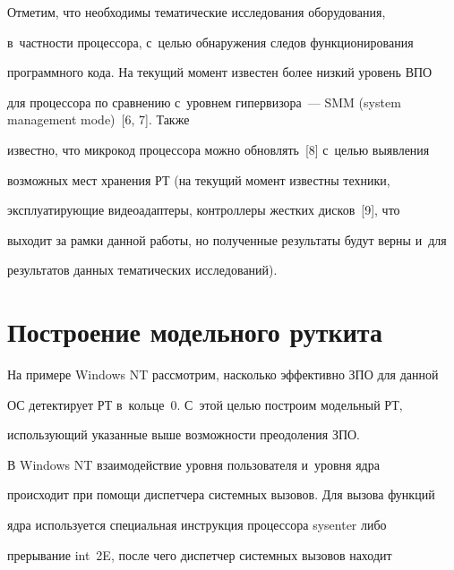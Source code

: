   


  Отметим, что необходимы тематические исследования оборудования, 


в~частности процессора, с~целью обнаружения следов функционирования 


программного кода. На текущий момент известен более низкий уровень ВПО 


для процессора по сравнению с~уровнем гипервизора~--- SMM (system management mode)~[6, 7]. Также 


известно, что микрокод процессора можно обновлять~[8] с~целью выявления 


возможных мест хранения РТ (на текущий момент известны техники, 


эксплуатирующие видеоадаптеры, контроллеры жестких дисков~[9], что 


выходит за рамки данной работы, но полученные результаты будут верны и~для 


результатов данных тематических исследований).





\vspace*{-4pt}


  


\section{Построение модельного руткита}





\vspace*{-2pt}





  На примере Windows NT рассмотрим, насколько эффективно ЗПО для данной 


ОС детектирует РТ в~кольце~0. С~этой целью построим модельный РТ, 


использующий указанные выше возможности преодоления ЗПО. 


  


  В Windows NT взаимодействие уровня пользователя и~уровня ядра 


происходит при помощи диспетчера системных вызовов. Для вызова функций 


ядра используется специальная инструкция процессора {\sf sysenter} либо 


прерывание {\sf int~2E}, после чего диспетчер системных вызовов находит 


